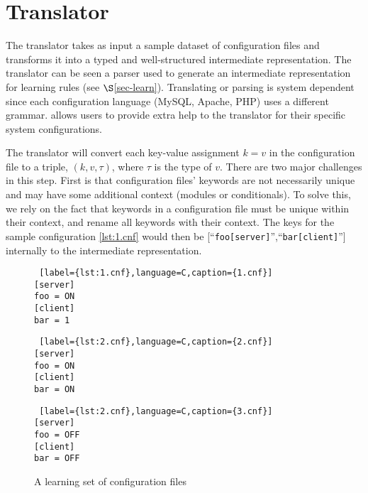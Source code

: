 
\section{Translator}
\label{sec-trans}

The translator takes as input a sample dataset of configuration files and transforms it into a typed and well-structured intermediate representation.
The translator can be seen a parser used to generate an intermediate representation for learning rules (see $\S$\ref{sec-learn}).
Translating or parsing is system dependent since each configuration language (MySQL, Apache, PHP) uses a different grammar.
\app allows users to provide extra help to the translator for their specific system configurations.

The translator will convert each key-value assignment $k=v$ in the configuration file to a triple, $(k, v, \tau)$, where $\tau$ is the type of $v$. 
There are two major challenges in this step.
First is that configuration files' keywords are not necessarily unique and may have some additional context (modules or conditionals).
To solve this, we rely on the fact that keywords in a configuration file must be unique within their context, and rename all keywords with their context.
The keys for the sample configuration \ref{lst:1.cnf} would then be [``{\tt foo[server]}'',``{\tt bar[client]}''] internally to the intermediate representation.


\begin{figure}[!htb]
    \caption{A learning set of configuration files}
    \centering
    \begin{minipage}{.25\textwidth}
	\begin{lstlisting} [label={lst:1.cnf},language=C,caption={1.cnf}]
[server]
foo = ON
[client]
bar = 1
	\end{lstlisting}
    \end{minipage}%
    \hspace{1cm}
    \begin{minipage}{0.25\textwidth}
	\begin{lstlisting} [label={lst:2.cnf},language=C,caption={2.cnf}]
[server]
foo = ON
[client]
bar = ON
	\end{lstlisting}
    \end{minipage}
    \hspace{1cm}
    \begin{minipage}{0.25\textwidth}
	\begin{lstlisting} [label={lst:2.cnf},language=C,caption={3.cnf}]
[server]
foo = OFF
[client]
bar = OFF
	\end{lstlisting}
    \end{minipage}
\end{figure}


